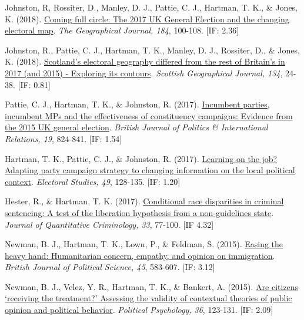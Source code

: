 \documentclass[12pt]{article}
\begin{document}
\begin{bibenum}
	\item Johnston, R, Rossiter, D., Manley, D. J., Pattie, C. J., 
		  {Hartman, T. K.}, \& Jones, K. (2018).
		  \href{https://10.1111/geoj.12240}
		  {Coming full circle: 
		  The 2017 UK General Election and the changing electoral map}. 
		  \emph{The Geographical Journal, 184}, 100-108. [IF: 2.36]
          
	\item Johnston, R., Pattie, C. J., {Hartman, T. K.}, Manley, D. J., 
		  Rossiter, D., \& Jones, K. (2018).
		  \href{https://10.1080/14702541.2017.1409362}
		  {Scotland's electoral geography 
		  differed from the rest of Britain's in 2017 (and 2015) - 
		  Exploring its contours}. 
		  \emph{Scottish Geographical Journal, 134}, 24-38. [IF: 0.81]
          
    \item Pattie, C. J., {Hartman, T. K.}, \& Johnston, R. (2017).
          \href{https://10.1177/1369148117718710}
          {Incumbent parties, incumbent MPs and the effectiveness of 
          constituency campaigns: Evidence from the 2015 UK general election}.
           \emph{British Journal of Politics \& International Relations, 19}, 824-841. [IF: 1.54]
          
    \item {Hartman, T. K.}, Pattie, C. J., \& Johnston, R. (2017).
    		\href{https://10.1016/j.electstud.2017.06.005}
          {Learning on the job? Adapting party campaign strategy 
          to changing information on the local political context}. 
          \emph{Electoral Studies, 49}, 128-135. [IF: 1.20]
          
    \item Hester, R., \& {Hartman, T. K.} (2017). 
          \href{https://10.1007/s10940-016-9283-z}
          {Conditional race disparities in criminal sentencing: 
          A test of the liberation hypothesis from a non-guidelines state}. 
          \emph{Journal of Quantitative Criminology, 33}, 77-100. [IF 4.32]
          
    \item Newman, B. J., {Hartman, T. K.}, Lown, P., \& Feldman, S. (2015). 
          \href{https://10.1017/S0007123413000410}
          {Easing the heavy hand: Humanitarian concern, empathy, and 
          opinion on immigration}. 
          \emph{British Journal of Political Science, 45}, 583-607. [IF: 3.12]
           
    \item *Newman, B. J., Velez, Y. R., {Hartman, T. K.}, \& Bankert, A. (2015). 
          \href{https://10.1111/pops.12069}
          {Are citizens `receiving the treatment?' Assessing the validity 
          of contextual theories of public opinion and political behavior}. 
          \emph{Political Psychology, 36}, 123-131. [IF: 2.09]


\end{bibenum}
\end{document}

